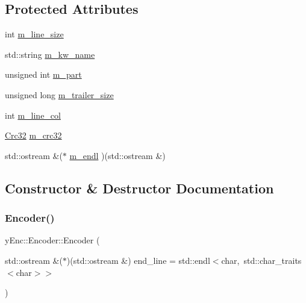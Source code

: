 \subsection*{Protected Attributes}
\begin{DoxyCompactItemize}
\item 
int \hyperlink{classy_enc_1_1_encoder_ab5f35568fd44473fdeac30abe8f16c3e}{m\+\_\+line\+\_\+size}
\item 
std\+::string \hyperlink{classy_enc_1_1_encoder_a99adeef35b508ce81611656a8ea03973}{m\+\_\+kw\+\_\+name}
\item 
unsigned int \hyperlink{classy_enc_1_1_encoder_a63655714426e38492761ac313df01ae9}{m\+\_\+part}
\item 
unsigned long \hyperlink{classy_enc_1_1_encoder_a16989cdea14ebcc4046b0a2ff815ac8d}{m\+\_\+trailer\+\_\+size}
\item 
int \hyperlink{classy_enc_1_1_encoder_a15950c25554a3e60df426002f0a50432}{m\+\_\+line\+\_\+col}
\item 
\hyperlink{class_crc32}{Crc32} \hyperlink{classy_enc_1_1_encoder_a37dfb1af4fb772ffc127253a2362a30f}{m\+\_\+crc32}
\item 
std\+::ostream \&($\ast$ \hyperlink{classy_enc_1_1_encoder_ad4b12df574cfbcc49be6ff1308bf8d77}{m\+\_\+endl} )(std\+::ostream \&)
\end{DoxyCompactItemize}


\subsection{Constructor \& Destructor Documentation}
\hypertarget{classy_enc_1_1_encoder_a2a2083685e653b8ad1b21a95a864bce3}{}\label{classy_enc_1_1_encoder_a2a2083685e653b8ad1b21a95a864bce3} 
\subsubsection{\texorpdfstring{Encoder()}{Encoder()}\hspace{0.1cm}{\footnotesize\ttfamily [1/3]}}
{\footnotesize\ttfamily y\+Enc\+::\+Encoder\+::\+Encoder (\begin{DoxyParamCaption}\item[{std\+::ostream \&($\ast$)(std\+::ostream \&)}]{end\+\_\+line = {\ttfamily std\+:\+:endl$<$char,~std\+:\+:char\+\_\+traits$<$char$>$$>$} }\end{DoxyParamCaption})\hspace{0.3cm}{\ttfamily [inline]}}

